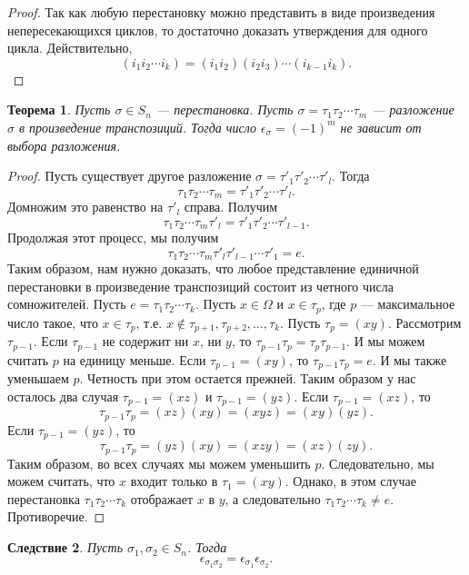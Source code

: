 \documentclass[12pt, titlepage, oneside]{amsbook}
\newtheorem{theorem}{Теорема}[chapter]
\newtheorem{corollary}[theorem]{Следствие}
\theoremstyle{definition}
\theoremstyle{remark}
\begin{document}
\begin{proof}
	Так как любую перестановку можно представить в виде произведения непересекающихся циклов, то достаточно доказать утверждения для одного цикла. Действительно, $$(i_1 i_2\cdots i_k)=(i_1i_2)(i_2i_3)\cdots(i_{k-1}i_k).$$
\end{proof}

\begin{theorem}
	\label{Pod3}
	Пусть $\sigma\in S_n$ --- перестановка. Пусть $\sigma=\tau_1\tau_2\cdots\tau_m$ --- разложение $\sigma$ в произведение транспозиций. Тогда число $\epsilon_{\sigma}=(-1)^m$ не зависит от выбора разложения.
\end{theorem}

\begin{proof}
	Пусть существует другое разложение $\sigma=\tau'_1\tau'_2\cdots\tau'_l$. Тогда $$\tau_1\tau_2\cdots\tau_m=\tau'_1\tau'_2\cdots\tau'_l.$$ Домножим это равенство на $\tau'_l$ справа. Получим $$\tau_1\tau_2\cdots\tau_m\tau'_l=\tau'_1\tau'_2\cdots\tau'_{l-1}.$$ Продолжая этот процесс, мы получим $$\tau_1\tau_2\cdots\tau_m\tau'_l\tau'_{l-1}\cdots\tau'_1=e.$$ Таким образом, нам нужно доказать, что любое представление единичной перестановки в произведение транспозиций состоит из четного числа сомножителей. Пусть $e=\tau_1\tau_2\cdots\tau_k$. Пусть $x\in\Omega$ и $x\in\tau_p$, где $p$ --- максимальное число такое, что $x\in\tau_p$, т.е. $x\not\in \tau_{p+1},\tau_{p+2},\ldots,\tau_k$. Пусть $\tau_p=(xy)$. Рассмотрим $\tau_{p-1}$. Если $\tau_{p-1}$ не содержит ни $x$, ни $y$, то $\tau_{p-1}\tau_p=\tau_p\tau_{p-1}$. И мы можем считать $p$ на единицу меньше. Если $\tau_{p-1}=(xy)$, то $\tau_{p-1}\tau_p=e$. И мы также уменьшаем $p$. Четность при этом остается прежней. Таким образом у нас осталось два случая $\tau_{p-1}=(xz)$ и $\tau_{p-1}=(yz)$. Если $\tau_{p-1}=(xz)$, то $$\tau_{p-1}\tau_p=(xz)(xy)=(xyz)=(xy)(yz).$$ Если $\tau_{p-1}=(yz)$, то $$\tau_{p-1}\tau_p=(yz)(xy)=(xzy)=(xz)(zy).$$ Таким образом, во всех случаях мы можем уменьшить $p$. Следовательно, мы можем считать, что $x$ входит только в $\tau_1=(xy)$. Однако, в этом случае перестановка $\tau_1\tau_2\cdots\tau_k$ отображает $x$ в $y$, а следовательно $\tau_1\tau_2\cdots\tau_k\neq e$. Противоречие.
\end{proof}

\begin{corollary}
	\label{Pod4}
	Пусть $\sigma_1,\sigma_2\in S_n$. Тогда $$\epsilon_{\sigma_1 \sigma_2}=\epsilon_{\sigma_1}\epsilon_{\sigma_2}.$$
\end{corollary}
\end{document}
